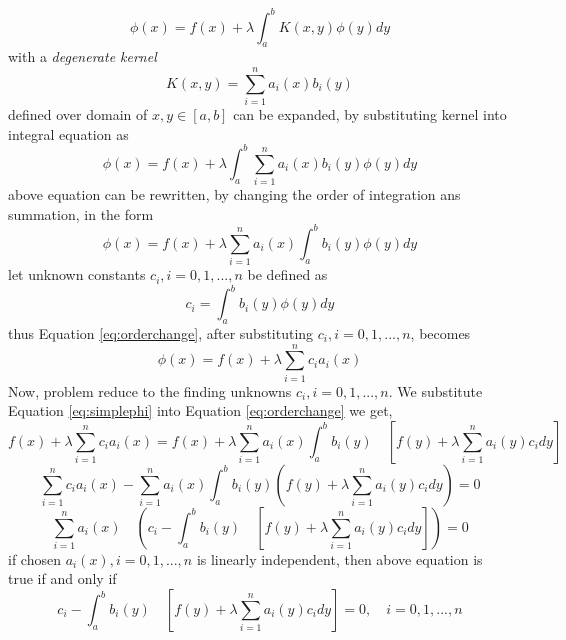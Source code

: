 \begin{appendix}
\begin{equation}
\phi(x)=f(x)+\lambda\int_a^b K(x,y)\phi(y)dy
\end{equation}
with a {\em degenerate kernel} 
\begin{equation}
 K(x,y) = \sum\limits_{i=1}^na_i(x)b_i(y)
\end{equation}
defined over domain of $x,y \in [a,b]$ can be expanded, by substituting kernel into integral equation as
\begin{equation}
 \phi(x)=f(x)+\lambda\int_a^b \sum\limits_{i=1}^na_i(x)b_i(y)\phi(y)dy
\end{equation}
above equation can be rewritten, by changing the order of integration ans summation, in the form
\begin{equation}\label{eq:orderchange}
 \phi(x)=f(x)+\lambda \sum\limits_{i=1}^na_i(x)\int_a^b b_i(y)\phi(y)dy
\end{equation}
let unknown constants $ c_i, i=0, 1, ..., n $ be defined as
\begin{equation}
 c_i=\int_a^b b_i(y)\phi(y)dy
\end{equation}
thus Equation \ref{eq:orderchange}, after substituting $c_i, i=0, 1, ..., n$, becomes
\begin{equation}\label{eq:simplephi}
 \phi(x)=f(x)+\lambda \sum\limits_{i=1}^nc_ia_i(x) 
\end{equation}
Now, problem reduce to the finding unknowns $ c_i, i=0, 1, ..., n $. We substitute Equation \ref{eq:simplephi} into Equation \ref{eq:orderchange} we get,
\begin{equation}
f(x)+\lambda \sum\limits_{i=1}^nc_ia_i(x) =f(x)+\lambda \sum\limits_{i=1}^na_i(x)\int_a^b b_i(y)\quad[f(y)+\lambda \sum\limits_{i=1}^na_i(y) c_idy] \quad
\end{equation}
\begin{equation}
\sum\limits_{i=1}^nc_ia_i(x) -\sum\limits_{i=1}^na_i(x)\int_a^b b_i(y)(f(y)+\lambda \sum\limits_{i=1}^na_i(y) c_idy)=0
\end{equation}
\begin{equation}
\sum\limits_{i=1}^na_i(x)\quad( c_i-\int_a^b b_i(y)\quad[f(y)+\lambda \sum\limits_{i=1}^na_i(y) c_idy])=0
\end{equation}
if chosen $a_i(x), i=0, 1, ..., n $ is linearly independent, then above equation is true if and only if 
\begin{equation}\label{eq:linearsystem}
c_i-\int_a^b b_i(y)\quad[f(y)+\lambda \sum\limits_{i=1}^na_i(y) c_idy]=0,\quad i=0, 1, ..., n 
\end{equation}

\end{appendix}
